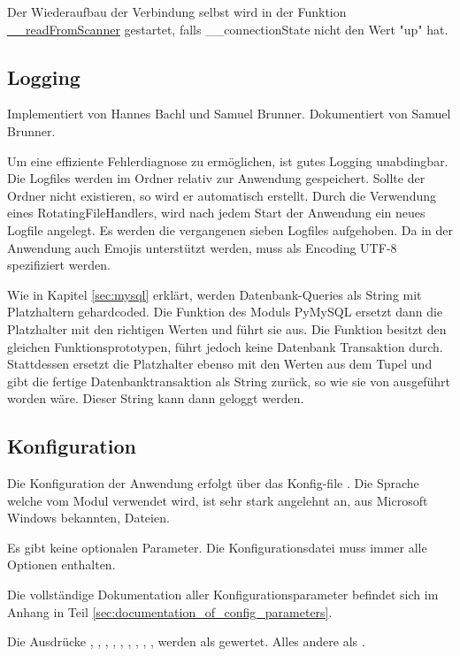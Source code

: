 \documentclass[12pt]{article}
\begin{document}
{Der Wiederaufbau der Verbindung selbst wird in der Funktion \hyperref[func:readFromScanner]{\_\_readFromScanner} gestartet, falls \_\_connectionState nicht den Wert "up" hat.

\subsection{Logging}

Implementiert von Hannes Bachl und Samuel Brunner. Dokumentiert von Samuel Brunner.

Um eine effiziente Fehlerdiagnose zu ermöglichen, ist gutes Logging unabdingbar. Die Logfiles werden im Ordner  relativ zur Anwendung gespeichert. 
Sollte der Ordner nicht existieren, so wird er automatisch erstellt. 
Durch die Verwendung eines RotatingFileHandlers, wird nach jedem Start der Anwendung ein neues Logfile angelegt. Es werden die vergangenen sieben Logfiles aufgehoben.
Da in der Anwendung auch Emojis unterstützt werden, muss als Encoding UTF-8 spezifiziert werden.

Wie in Kapitel \ref{sec:mysql} erklärt, werden Datenbank-Queries als String mit Platzhaltern gehardcoded. Die Funktion  des Moduls PyMySQL ersetzt dann die Platzhalter mit den richtigen Werten und führt sie aus. Die Funktion  besitzt den gleichen Funktionsprototypen, führt jedoch keine Datenbank Transaktion durch. Stattdessen ersetzt  die Platzhalter ebenso mit den Werten aus dem Tupel und gibt die fertige Datenbanktransaktion als String zurück, so wie sie von  ausgeführt worden wäre. Dieser String kann dann geloggt werden.

\subsection{Konfiguration}
Die Konfiguration der Anwendung erfolgt über das Konfig-file . Die Sprache welche vom Modul  verwendet wird, ist sehr stark angelehnt an, aus Microsoft Windows bekannten,  Dateien.

Es gibt keine optionalen Parameter. Die Konfigurationsdatei muss immer alle Optionen enthalten.

Die vollständige Dokumentation aller Konfigurationsparameter befindet sich im Anhang in Teil \ref{sec:documentation_of_config_parameters}. 

Die Ausdrücke , , , , , , , , ,  werden als  gewertet. Alles andere als .

}
\end{document}
